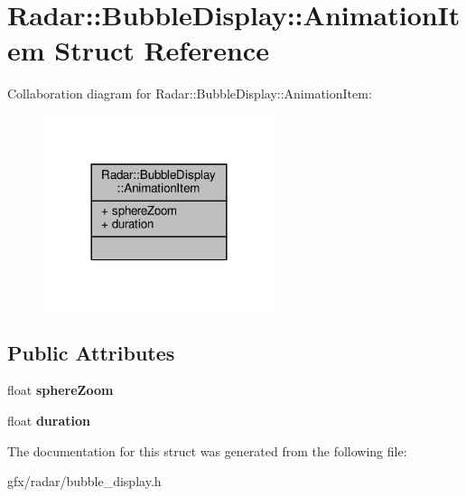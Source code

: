 \hypertarget{structRadar_1_1BubbleDisplay_1_1AnimationItem}{}\section{Radar\+:\+:Bubble\+Display\+:\+:Animation\+Item Struct Reference}
\label{structRadar_1_1BubbleDisplay_1_1AnimationItem}


Collaboration diagram for Radar\+:\+:Bubble\+Display\+:\+:Animation\+Item\+:
\nopagebreak
\begin{figure}[H]
\begin{center}
\leavevmode
\includegraphics[width=192pt]{d9/dab/structRadar_1_1BubbleDisplay_1_1AnimationItem__coll__graph}
\end{center}
\end{figure}
\subsection*{Public Attributes}
\begin{DoxyCompactItemize}
\item 
float {\bfseries sphere\+Zoom}\hypertarget{structRadar_1_1BubbleDisplay_1_1AnimationItem_aed4cc3d538f8e42ffe8e8cae97ec6adb}{}\label{structRadar_1_1BubbleDisplay_1_1AnimationItem_aed4cc3d538f8e42ffe8e8cae97ec6adb}

\item 
float {\bfseries duration}\hypertarget{structRadar_1_1BubbleDisplay_1_1AnimationItem_a0c982c03f513e18ac3d381b588edc16c}{}\label{structRadar_1_1BubbleDisplay_1_1AnimationItem_a0c982c03f513e18ac3d381b588edc16c}

\end{DoxyCompactItemize}


The documentation for this struct was generated from the following file\+:\begin{DoxyCompactItemize}
\item 
gfx/radar/bubble\+\_\+display.\+h\end{DoxyCompactItemize}
